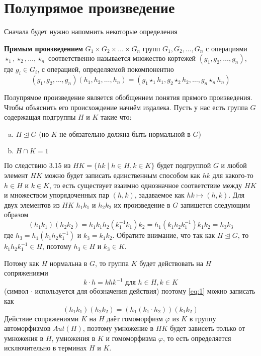 \section{Полупрямое произведение}\label{semidirect_product}

Сначала будет нужно напомнить некоторые определения
\begin{definition}
  \textbf{Прямым произведением} $G_1 \times G_2 \times \ldots \times G_n$ групп $G_1, G_2, \ldots, G_n$ с операциями $\star_1, \star_2, \ldots, \star_n$ соответственно называется множество кортежей $(g_1, g_2, \ldots, g_n)$, где $g_i \in G_i$, с операцией, определяемой покомпонентно
  \[
   	(g_1, g_2, \ldots, g_n) (h_1, h_2, \ldots, h_n) = (g_1 \star_1 h_1, g_2 \star_2 h_2, \ldots, g_n \star_n h_n)
  \]
\end{definition}


Полупрямое произведение является обобщением понятия прямого произведения. Чтобы объяснить его происхождение начнём издалека. Пусть у нас есть группа $G$ содержащая подгруппы $H$ и $K$ такие что:
\begin{enumerate}[(a)]
  \item $H \unlhd G$ (но $K$ не обязательно должна быть нормальной в $G$) \label{it:a}
  \item $H \cap K = 1$ \label{it:b}
\end{enumerate}
По следствию 3.15 из \cite[94]{Dummit99} $HK=\{hk \mid h \in H, k \in K\}$ будет подгруппой $G$ и любой элемент $HK$ можно будет записать единственным способом как $hk$ для какого-то $h \in H$ и $k \in K$, то есть существует взаимно однозначное соответствие между $HK$ и множеством упорядоченных пар $(h,k)$, задаваемое как $hk \mapsto (h,k)$. Для двух элементов из $HK$ $h_1k_1$ и $h_2k_2$ их произведение в $G$ запишется следующим образом
\begin{equation}
	(h_1k_1)(h_2k_2)=h_1k_1h_2(k_1^{-1}k_1)k_2=h_1(k_1h_2k_1^{-1})k_1k_2=h_3k_3
\label{eq:1}
\end{equation}
где $h_3=h_1(k_1h_2k_1^{-1})$ и $k_3=k_1k_2$. Обратите внимание, что так как $H \unlhd G$, то $k_1h_2k_1^{-1} \in H$, поэтому $h_3 \in H$ и $k_3 \in K$.

Потому как $H$ нормальна в $G$, то группа $K$ будет действовать на $H$ сопряжениями
\[
	k \cdot h=khk^{-1} \mbox{ для } h \in H, k \in K
\] 
(символ $ \cdot $ используется для обозначения действия) поэтому \eqref{eq:1} можно записать как 
\[
	(h_1k_1)(h_2k_2)=(h_1(k_1 \cdot h_2))(k_1k_2)
\]
Действие сопряжениями $K$ на $H$ даёт гомоморфизм $\varphi$ из $K$ в группу автоморфизмов $Aut(H)$, поэтому умножение в $HK$ будет зависеть только от умножения в $H$, умножения в $K$ и гомоморфизма $\varphi$, то есть определяется исключительно в терминах $H$ и $K$.

